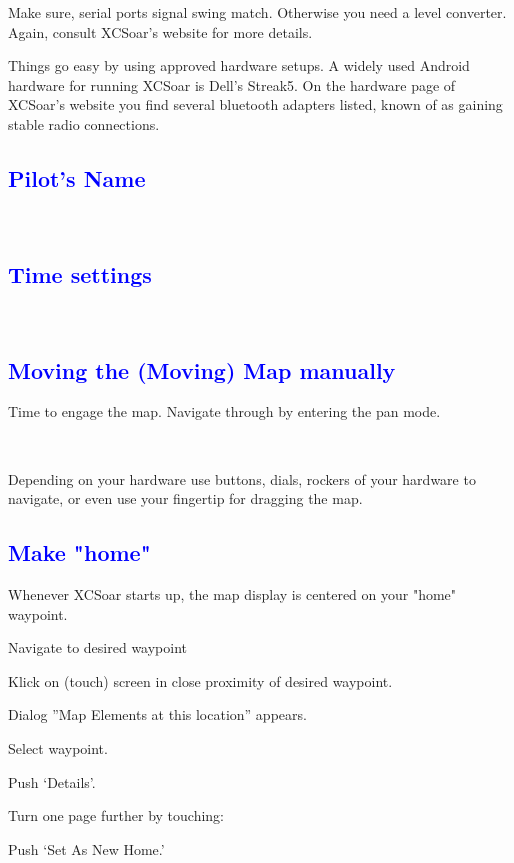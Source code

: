 Make sure, serial ports signal swing match.  Otherwise you need a level 
converter. Again, consult XCSoar's website for more details.

Things go easy by using approved hardware setups. A widely used Android 
hardware for running XCSoar is Dell's Streak5. On the hardware page of 
XCSoar's website you find several bluetooth adapters listed, known of as 
gaining stable radio connections. 

\subsection*{\textcolor{blue}{Pilot's Name}}
\begin{flushleft}\hspace*{1cm}\sk\blink{}\blink{}\\\end{flushleft}

\subsection*{\textcolor{blue}{Time settings}}
\begin{flushleft}\hspace*{1cm}\sk\blink{}\blink{}\\\end{flushleft}

\subsection*{\textcolor{blue}{Moving the (Moving) Map manually}}
Time to engage the map.  Navigate through by entering the pan mode.
\begin{flushleft}\hspace*{1cm}\\\end{flushleft}
Depending on your hardware use buttons, dials, rockers of your hardware to 
navigate, or even use your fingertip for dragging the map.

\subsection*{\textcolor{blue}{Make "home"}}
Whenever XCSoar starts up, the map display is centered on your "home" 
waypoint.
\begin{compactitem}
\item Navigate to desired waypoint
\item Klick on (touch) screen in close proximity of desired waypoint.
\item Dialog ''Map Elements at this location'' appears.
\item Select waypoint.
\item Push `Details'.
\item Turn one page further by touching: \blink
\item Push `Set As New Home.'
\end{compactitem}

